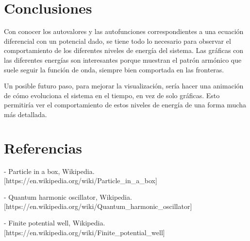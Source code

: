 \documentclass{article}
\begin{document}
\section{Conclusiones}

Con conocer los autovalores y las autofunciones correspondientes a una ecuación diferencial con un potencial dado, se tiene todo lo necesario para observar el comportamiento de los diferentes niveles de energía del sistema. Las gráficas con las diferentes energías son interesantes porque muestran el patrón armónico que suele seguir la función de onda, siempre bien comportada en las fronteras.

Un posible futuro paso, para mejorar la visualización, sería hacer una animación de cómo evoluciona el sistema en el tiempo, en vez de solo gráficas. Esto permitiría ver el comportamiento de estos niveles de energía de una forma mucha más detallada.


\section{Referencias}

- Particle in a box, Wikipedia. [https://en.wikipedia.org/wiki/Particle\_in\_a\_box]

- Quantum harmonic oscillator, Wikipedia. [https://en.wikipedia.org/wiki/Quantum\_harmonic\_oscillator]

- Finite potential well, Wikipedia. [https://en.wikipedia.org/wiki/Finite\_potential\_well]
\end{document}
